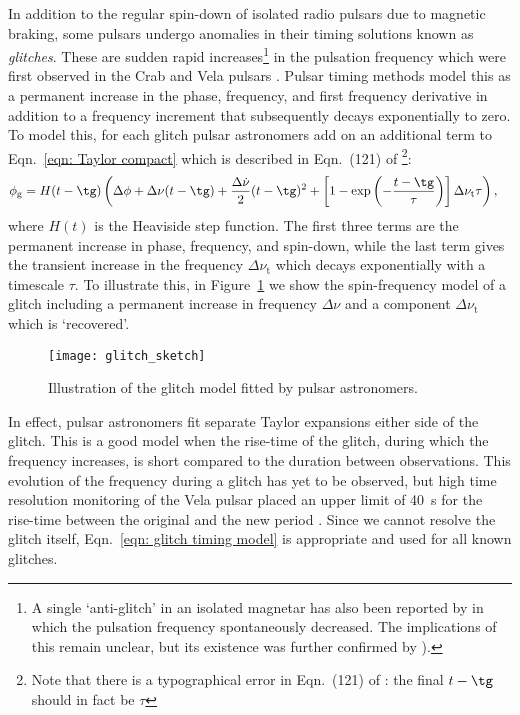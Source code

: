 In addition to the regular spin-down of isolated radio pulsars due to magnetic
braking,
some pulsars undergo anomalies in their timing solutions known as
\emph{glitches}.  These are sudden rapid increases\footnote{A single `anti-glitch'
in an isolated magnetar has also been reported by \citet{archibald2013anti} in
which the pulsation frequency spontaneously decreased. The implications of this
remain unclear, but its existence was further confirmed by \citet{hu2014glitch}).}
 in the pulsation frequency
which were first observed in the Crab \citep{Boynton1969, Richards1969} and
Vela pulsars \citep{RadhakrishnanManchester1969, Reichley1969}. Pulsar
timing methods model this as a permanent increase in the phase, frequency, and
first frequency derivative in addition to a frequency increment that
subsequently decays exponentially to zero.  To model this,
for each glitch pulsar astronomers add on an additional term to
Eqn.~\eqref{eqn: Taylor compact} which is described in
Eqn.~(121) of \citet{Edwards2006}\footnote{Note that there is a typographical
error in Eqn.~(121) of \citet{Edwards2006}: the final $t-\tg$ should in fact
be $\tau$}:
\begin{align}
\begin{split}
\phi_{\textrm{g}} = H(t - \tg)& {}\left(
\Delta\phi + \Delta\nu(t - \tg) + \frac{\Delta\dot{\nu}}{2}(t - \tg)^{2}
+ \left[1-\exp\left(-\frac{t - \tg}{\tau}\right)\right]
\Delta\nu_{\textrm{t}}\tau
\right),
\end{split}
\label{eqn: glitch timing model}
\end{align}
where $H(t)$ is the Heaviside step function. The first
three terms are the permanent increase in phase, frequency, and spin-down,
while the last term gives the transient increase in the frequency
$\Delta\nu_{\textrm{t}}$ which decays exponentially with a timescale $\tau$.
To illustrate this, in Figure~\ref{fig: glitch sketch} we show the spin-frequency
model of a glitch including a permanent increase in frequency $\Delta\nu$ and
a component $\Delta\nu_{\textrm{t}}$ which is `recovered'.
\begin{figure}[htb]
\centering
\texttt{[image: glitch\_sketch]}
\caption{Illustration of the glitch model fitted by pulsar astronomers.}
\label{fig: glitch sketch}
\end{figure}

In effect, pulsar astronomers fit separate Taylor expansions either side of the
glitch. This is a good model when the rise-time of the glitch, during which the
frequency increases, is short compared to the duration between observations.
This evolution of the frequency during a glitch has yet to be observed, but
high time resolution monitoring of the Vela pulsar placed an upper limit of
40~s for the rise-time between the original and the new period
\citep{dodson2001}. Since we cannot resolve the glitch itself,
Eqn.~\eqref{eqn: glitch timing model} is appropriate and used for all known
glitches.

